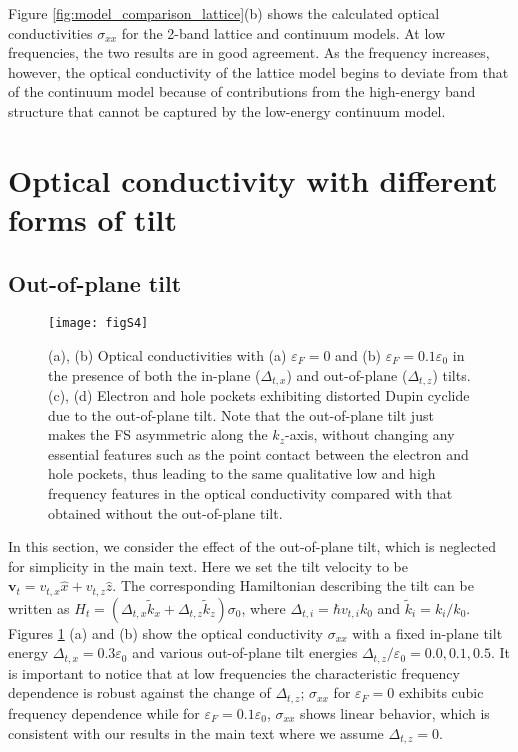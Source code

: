 \documentclass[aps,twocolumn,floatfix]{revtex4-1}
\begin{document}
Figure \ref{fig:model_comparison_lattice}(b) shows the calculated optical conductivities $\sigma_{xx}$ for the 2-band lattice and continuum models. At low frequencies, 
the two results are in good agreement. As the frequency increases, however, the optical conductivity of the lattice model begins to deviate from that of the continuum model because of contributions from the high-energy band structure that cannot be captured by the low-energy continuum model.

\section{Optical conductivity with different forms of tilt}
\subsection{Out-of-plane tilt}
\label{sec:kz_tilt}
\begin{figure}[!htb]
\texttt{[image: figS4]}
\caption{
(a), (b) Optical conductivities with (a) $\varepsilon_{F}=0$ and (b) $\varepsilon_{F}=0.1 \varepsilon_0$ in the presence of both the in-plane ($\Delta_{{t},x}$) and out-of-plane ($\Delta_{{t},z}$) tilts. (c), (d) Electron and hole pockets exhibiting distorted Dupin cyclide due to the out-of-plane tilt. Note that the out-of-plane tilt just makes the FS asymmetric along the $k_z$-axis, without changing any essential features such as the point contact between the electron and hole pockets, thus leading to the same qualitative low and high frequency features in the optical conductivity compared with that obtained without the out-of-plane tilt.
}
\label{fig:kz_tilt}
\end{figure}
In this section, we consider the effect of the out-of-plane tilt, which is neglected for simplicity in the main text. Here we set the tilt velocity to be $\bm{v}_t=v_{t,x}\hat{x}+v_{t,z}\hat{z}$. The corresponding Hamiltonian describing the tilt can be written as $H_t=(\Delta_{t,x}\tilde{k}_x+\Delta_{t,z}\tilde{k}_z)\sigma_0$, where $\Delta_{t,i}=\hbar v_{t,i} k_0$ and $\tilde{k}_i=k_i/k_0$. Figures \ref{fig:kz_tilt} (a) and (b) show the optical conductivity $\sigma_{xx}$ with a fixed in-plane tilt energy $\Delta_{t,x}=0.3\varepsilon_0$ and various out-of-plane tilt energies $\Delta_{t,z}/\varepsilon_0=0.0,0.1,0.5$.
It is important to notice that at low frequencies the characteristic frequency dependence is robust against the change of $\Delta_{t,z}$; $\sigma_{xx}$ for $\varepsilon_{F}=0$ exhibits cubic frequency dependence while for $\varepsilon_{F}=0.1 \varepsilon_0$, $\sigma_{xx}$ shows linear behavior, which is consistent with our results in the main text where we assume $\Delta_{t,z}=0$.
\end{document}
